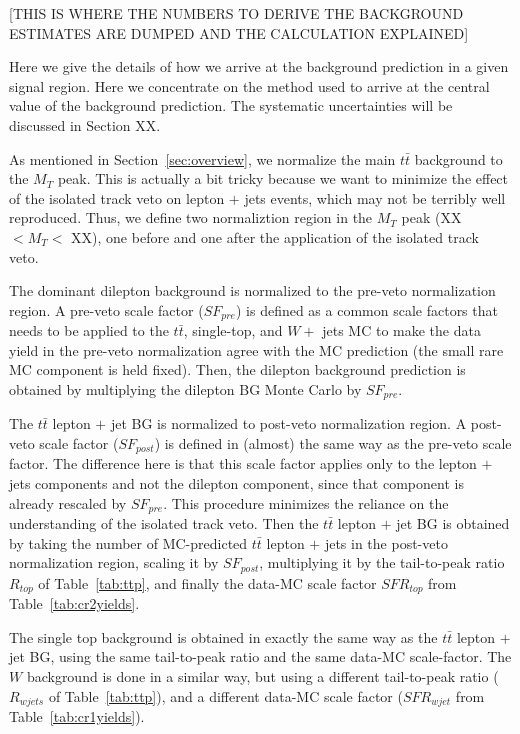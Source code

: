 

[THIS IS WHERE THE NUMBERS TO DERIVE THE BACKGROUND ESTIMATES ARE DUMPED AND THE CALCULATION EXPLAINED]

Here we give the details of how we arrive at the background prediction
in a given signal region.  Here we concentrate on the method used
to arrive at the central value of the background prediction.  The
systematic
uncertainties will be discussed in Section XX.

As mentioned in Section~\ref{sec:overview}, we normalize the main
$t\bar{t}$
background to the $M_T$ peak.  This is actually a bit tricky because 
we want to minimize the effect of the isolated track veto on 
lepton $+$ jets events, which may not be terribly well reproduced.
Thus, we define two normaliztion region in the $M_T$ peak (XX $< M_T <$ XX),
one before and one after the application of the isolated track veto.

The dominant dilepton background is normalized to the pre-veto normalization
region.  A pre-veto scale factor ($SF_{pre}$) is defined as a common scale
factors that needs to be applied to the $t\bar{t}$, single-top, and 
$W +$ jets
MC to make the data yield in the pre-veto normalization agree with
the MC prediction (the small rare MC component is held fixed).
Then, the dilepton background prediction is obtained by multiplying the
dilepton BG Monte Carlo by $SF_{pre}$.

The $t\bar{t}$ lepton $+$ jet BG is normalized to post-veto 
normalization region.  A post-veto scale factor  ($SF_{post}$) 
is defined in (almost) the same way as the pre-veto scale factor.
The difference here is that this scale factor applies only to 
the lepton $+$ jets components and not the dilepton component,
since that component is already rescaled by $SF_{pre}$.  
This procedure minimizes the reliance on the understanding of 
the isolated track veto.
Then the  $t\bar{t}$ lepton $+$ jet BG is obtained by taking the 
number of MC-predicted $t\bar{t}$ lepton $+$ jets in the post-veto
normalization region, scaling it by $SF_{post}$, multiplying 
it by the tail-to-peak ratio $R_{top}$ of Table~\ref{tab:ttp}, and
finally the data-MC scale factor $SFR_{top}$ from
Table~\ref{tab:cr2yields}.

The single top background is obtained in exactly the same way
as the  $t\bar{t}$ lepton $+$ jet BG, using the same tail-to-peak
ratio and the same data-MC scale-factor.  The $W$ background is
done in a similar way, but using a different tail-to-peak ratio 
($R_{wjets}$ of Table~\ref{tab:ttp}), and a different data-MC scale
factor
($SFR_{wjet}$ from
Table~\ref{tab:cr1yields}).

